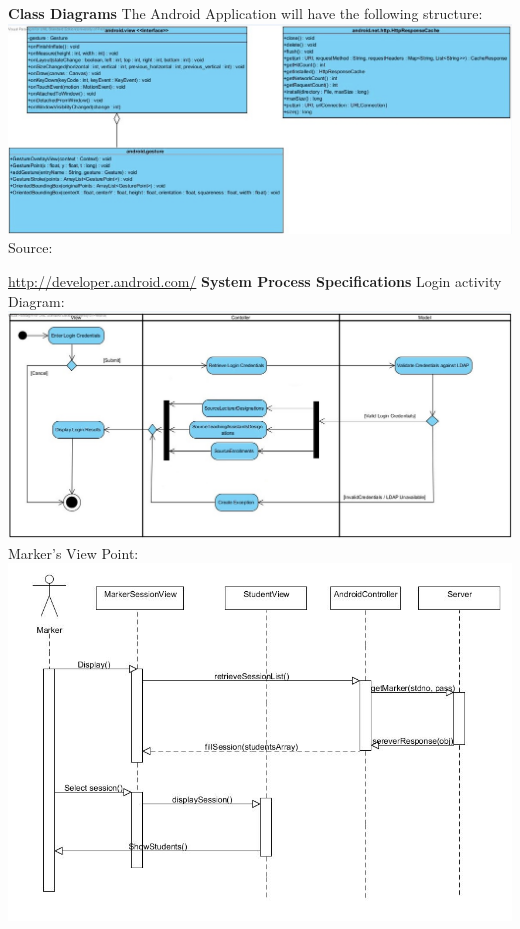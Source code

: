 \documentclass{article}
\begin{document}
\noindent \textbf{Class Diagrams}
The Android Application will have the following structure: 
\noindent \textbf{\includegraphics[scale=0.4]{androidClass.jpg}}
Source:
\usepackage{hyperref}
\url{http://developer.android.com/}
\noindent \textbf{System Process Specifications}
Login activity Diagram:
\noindent \textbf{\includegraphics[scale=0.4]{androidLogin.jpg}}
Marker's View Point:
\noindent \textbf{\includegraphics[scale=0.4]{androidSpecs.jpg}}

\noindent \textbf{}

\noindent \textbf{}
\end{document}
